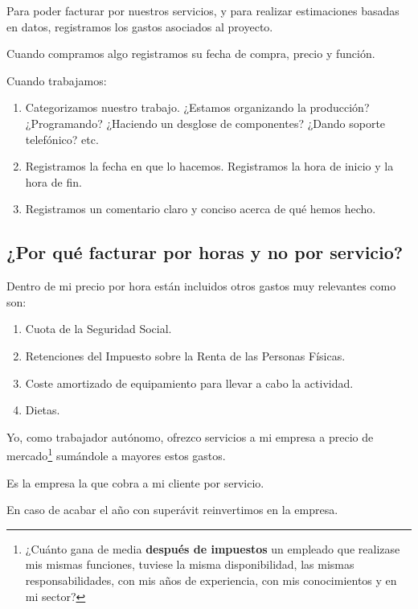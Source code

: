 Para poder facturar por nuestros servicios, y para realizar estimaciones
basadas en datos, registramos los gastos asociados al proyecto.

Cuando compramos algo registramos su fecha de compra, precio y función.

Cuando trabajamos:
\begin{enumerate}
    \item Categorizamos nuestro trabajo. ¿Estamos organizando la producción?
          ¿Programando? ¿Haciendo un desglose de componentes? ¿Dando soporte
          telefónico? etc.
    \item Registramos la fecha en que lo hacemos. Registramos la hora de inicio
          y la hora de fin.
    \item Registramos un comentario claro y conciso acerca de qué hemos hecho.
\end{enumerate}

\subsection{¿Por qué facturar por horas y no por servicio?}

Dentro de mi precio por hora están incluidos otros gastos muy relevantes como son:

\begin{enumerate}
    \item Cuota de la Seguridad Social.
    \item Retenciones del Impuesto sobre la Renta de las Personas Físicas.
    \item Coste amortizado de equipamiento para llevar a cabo la actividad.
    \item Dietas.
\end{enumerate}

Yo, como trabajador autónomo, ofrezco servicios a mi empresa a precio de mercado\footnote{%
    ¿Cuánto gana de media \textbf{después de impuestos} un empleado que realizase mis mismas
    funciones, tuviese la misma disponibilidad, las mismas responsabilidades, con mis años
    de experiencia, con mis conocimientos y en mi sector?
}
sumándole a mayores estos gastos.

Es la empresa la que cobra a mi cliente por servicio.

En caso de acabar el año con superávit reinvertimos en la empresa.
